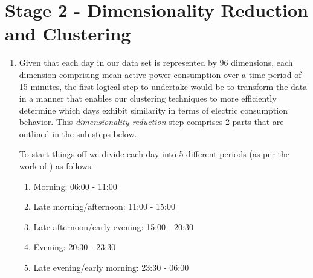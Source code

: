 \section{Stage 2 - Dimensionality Reduction and Clustering}
\label{sec:Methodology:Stage-2}
\begin{adjustwidth}{-1.65cm}{-0.0cm}%
    \begin{enumerate}[label=Step 2.\arabic*:, leftmargin=*]
    \setlength\itemsep{1em}
        \item Given that each day in our data set is represented by 96 dimensions, each dimension comprising mean active power consumption over a time period of 15 minutes, the first logical step to undertake would be to transform the data in a manner that enables our clustering techniques to more efficiently determine which days exhibit similarity in terms of electric consumption behavior. This \textit{dimensionality reduction} step comprises 2 parts that are outlined in the sub-steps below.
        
        \noindent \newline To start things off we divide each day into 5 different periods (as per the work of \citet{Yildiz}) as follows:
            \begin{enumerate}[label=\arabic*:, leftmargin=.75cm]
                \item Morning: 06:00 - 11:00
                \item Late morning/afternoon: 11:00 - 15:00
                \item Late afternoon/early evening: 15:00 - 20:30
                \item Evening: 20:30 - 23:30
                \item Late evening/early morning: 23:30 - 06:00
            \end{enumerate}
        

\end{enumerate}
\end{adjustwidth}
